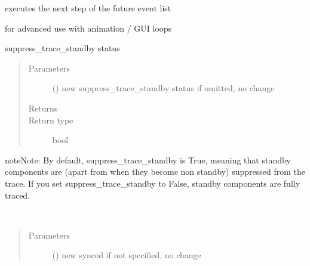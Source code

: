 \documentclass[letterpaper,10pt,english]{sphinxmanual}
\begin{document}
\begin{fulllineitems}
\begin{fulllineitems}
\begin{quote}
\begin{description}
\end{description}\end{quote}

\end{fulllineitems}


\begin{fulllineitems}
\label{\detokenize{Reference:salabim.Environment.step}}
executes the next step of the future event list

for advanced use with animation / GUI loops

\end{fulllineitems}


\begin{fulllineitems}
\label{\detokenize{Reference:salabim.Environment.suppress_trace_standby}}
suppress\_trace\_standby status
\begin{quote}\begin{description}
\item[{Parameters}] \leavevmode
{} () \textendash{} new suppress\_trace\_standby status 
if omitted, no change

\item[{Returns}] \leavevmode
{}

\item[{Return type}] \leavevmode
bool

\end{description}\end{quote}

\begin{sphinxadmonition}{note}{Note:}
By default, suppress\_trace\_standby is True, meaning that standby components are
(apart from when they become non standby) suppressed from the trace. 
If you set suppress\_trace\_standby to False, standby components are fully traced.
\end{sphinxadmonition}

\end{fulllineitems}


\begin{fulllineitems}
\label{\detokenize{Reference:salabim.Environment.synced}}~\begin{quote}\begin{description}
\item[{Parameters}] \leavevmode
{} () \textendash{} new synced 
if not specified, no change


\end{description}
\end{quote}
\end{fulllineitems}
\end{fulllineitems}
\end{document}
